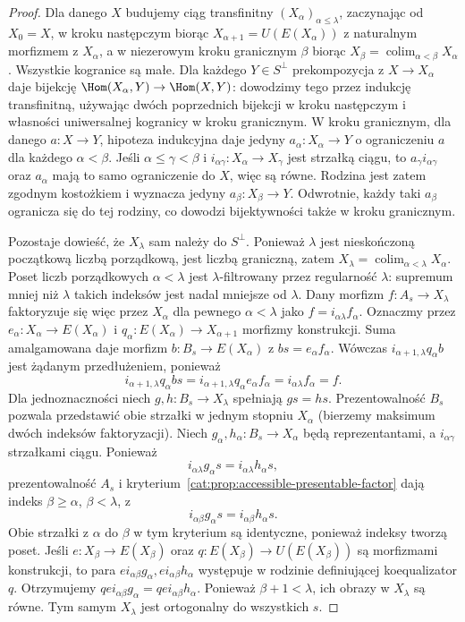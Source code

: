 \begin{proof}
Dla danego $X$ budujemy ciąg transfinitny $(X_\alpha)_{\alpha\leq\lambda}$, zaczynając od $X_0=X$, w kroku następczym biorąc $X_{\alpha+1}=U(E(X_\alpha))$ z naturalnym morfizmem z $X_\alpha$, a w niezerowym kroku granicznym $\beta$ biorąc $X_\beta=\operatorname{colim}_{\alpha<\beta}X_\alpha$. Wszystkie kogranice są małe. Dla każdego $Y\in S^\perp$ prekompozycja z $X\to X_\alpha$ daje bijekcję $\Hom(X_\alpha,Y)\to\Hom(X,Y)$: dowodzimy tego przez indukcję transfinitną, używając dwóch poprzednich bijekcji w kroku następczym i własności uniwersalnej kogranicy w kroku granicznym. W kroku granicznym, dla danego $a:X\to Y$, hipoteza indukcyjna daje jedyny $a_\alpha:X_\alpha\to Y$ o ograniczeniu $a$ dla każdego $\alpha<\beta$. Jeśli $\alpha\leq\gamma<\beta$ i $i_{\alpha\gamma}:X_\alpha\to X_\gamma$ jest strzałką ciągu, to $a_\gamma i_{\alpha\gamma}$ oraz $a_\alpha$ mają to samo ograniczenie do $X$, więc są równe. Rodzina jest zatem zgodnym kostożkiem i wyznacza jedyny $a_\beta:X_\beta\to Y$. Odwrotnie, każdy taki $a_\beta$ ogranicza się do tej rodziny, co dowodzi bijektywności także w kroku granicznym.

Pozostaje dowieść, że $X_\lambda$ sam należy do $S^\perp$. Ponieważ $\lambda$ jest nieskończoną początkową liczbą porządkową, jest liczbą graniczną, zatem $X_\lambda=\operatorname{colim}_{\alpha<\lambda}X_\alpha$. Poset liczb porządkowych $\alpha<\lambda$ jest $\lambda$-filtrowany przez regularność $\lambda$: supremum mniej niż $\lambda$ takich indeksów jest nadal mniejsze od $\lambda$. Dany morfizm $f:A_s\to X_\lambda$ faktoryzuje się więc przez $X_\alpha$ dla pewnego $\alpha<\lambda$ jako $f=i_{\alpha\lambda}f_\alpha$. Oznaczmy przez $e_\alpha:X_\alpha\to E(X_\alpha)$ i $q_\alpha:E(X_\alpha)\to X_{\alpha+1}$ morfizmy konstrukcji. Suma amalgamowana daje morfizm $b:B_s\to E(X_\alpha)$ z $bs=e_\alpha f_\alpha$. Wówczas $i_{\alpha+1,\lambda}q_\alpha b$ jest żądanym przedłużeniem, ponieważ
\[
 i_{\alpha+1,\lambda}q_\alpha bs
 =i_{\alpha+1,\lambda}q_\alpha e_\alpha f_\alpha
 =i_{\alpha\lambda}f_\alpha=f.
\] Dla jednoznaczności niech $g,h:B_s\to X_\lambda$ spełniają $gs=hs$. Prezentowalność $B_s$ pozwala przedstawić obie strzałki w jednym stopniu $X_\alpha$ (bierzemy maksimum dwóch indeksów faktoryzacji). Niech $g_\alpha,h_\alpha:B_s\to X_\alpha$ będą reprezentantami, a $i_{\alpha\gamma}$ strzałkami ciągu. Ponieważ
\[
 i_{\alpha\lambda}g_\alpha s=i_{\alpha\lambda}h_\alpha s,
\]
prezentowalność $A_s$ i kryterium~\ref{cat:prop:accessible-presentable-factor} dają indeks $\beta\geq\alpha$, $\beta<\lambda$, z
\[
 i_{\alpha\beta}g_\alpha s=i_{\alpha\beta}h_\alpha s.
\]
Obie strzałki z $\alpha$ do $\beta$ w tym kryterium są identyczne, ponieważ indeksy tworzą poset. Jeśli $e:X_\beta\to E(X_\beta)$ oraz $q:E(X_\beta)\to U(E(X_\beta))$ są morfizmami konstrukcji, to para $ei_{\alpha\beta}g_\alpha,ei_{\alpha\beta}h_\alpha$ występuje w rodzinie definiującej koequalizator $q$. Otrzymujemy $qei_{\alpha\beta}g_\alpha=qei_{\alpha\beta}h_\alpha$. Ponieważ $\beta+1<\lambda$, ich obrazy w $X_\lambda$ są równe. Tym samym $X_\lambda$ jest ortogonalny do wszystkich $s$.


\end{proof}
